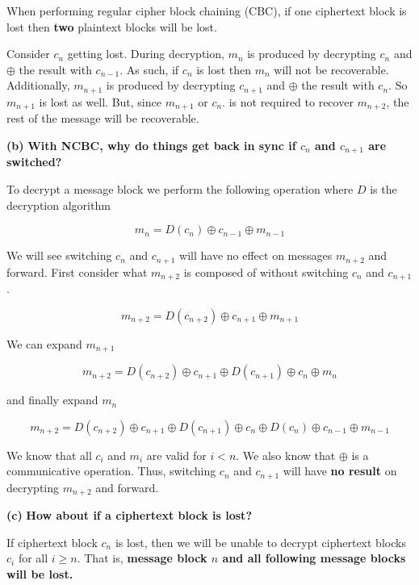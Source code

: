 \documentclass[11pt]{article}
\renewcommand\part[1]{\vspace{.10in}\textbf{(#1)}}
\begin{document}
When performing regular cipher block chaining (CBC), if one ciphertext block is lost then \textbf{two} plaintext blocks will be lost.

Consider $c_{n}$ getting lost. During decryption, $m_{n}$ is produced by decrypting $c_{n}$ and $\oplus$ the result with $c_{n-1}$. As such, if $c_{n}$ is lost then $m_{n}$ will not be recoverable. Additionally, $m_{n+1}$ is produced by decrypting $c_{n+1}$ and $\oplus$ the result with $c_{n}$. So $m_{n+1}$ is lost as well. But, since $m_{n+1}$ or $c_{n}$. is not required to recover $m_{n+2}$, the rest of the message will be recoverable.

\part{b} \textbf{With NCBC, why do things get back in sync if $c_n$ and $c_{n+1}$ are switched?} \newline

To decrypt a message block we perform the following operation where $D$ is the decryption algorithm

$$m_n = D(c_n) \oplus c_{n-1} \oplus m_{n - 1}$$

We will see switching $c_n$ and $c_{n+1}$ will have no effect on messages $m_{n+2}$ and forward. First consider what $m_{n+2}$ is composed of without switching $c_n$ and $c_{n+1}$.

$$m_{n+2} = D(c_{n+2}) \oplus c_{n + 1} \oplus m_{n + 1}$$

We can expand $m_{n + 1}$

$$m_{n+2} = D(c_{n+2}) \oplus c_{n + 1} \oplus D(c_{n+1}) \oplus c_{n} \oplus m_{n}$$

and finally expand $m_{n}$

$$m_{n+2} = D(c_{n+2}) \oplus c_{n + 1} \oplus D(c_{n+1}) \oplus c_{n} \oplus D(c_n) \oplus c_{n-1} \oplus m_{n-1}$$

We know that all $c_i$ and $m_i$ are valid for $i < n$. We also know that $\oplus$ is a communicative operation. Thus, switching $c_n$ and $c_{n+1}$ will have \textbf{no result} on decrypting $m_{n+2}$ and forward. 

\part{c} \textbf{How about if a ciphertext block is lost?} \newline

If ciphertext block $c_n$ is lost, then we will be unable to decrypt ciphertext blocks $c_i$ for all $i \geq n$. That is, \textbf{message block $n$ and all following message blocks will be lost.}
\end{document}
